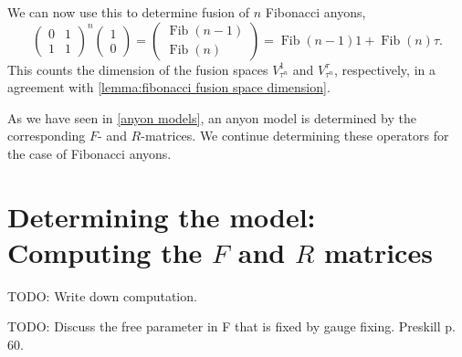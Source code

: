 \documentclass[a4paper,10pt,oneside]{book}
\theoremstyle{plain}
\theoremstyle{definition}
\theoremstyle{remark}
\DeclareMathOperator{\Fib}{Fib}
\begin{document}
We can now use this to determine fusion of $n$ Fibonacci anyons,
\begin{equation}
  \begin{pmatrix}
    0 & 1 \\
    1 & 1
  \end{pmatrix}^n
  \begin{pmatrix}
    1 \\ 0
  \end{pmatrix} =
  \begin{pmatrix}
    \Fib(n-1) \\ \Fib(n)
  \end{pmatrix}
  = \Fib(n-1) 1 + \Fib(n) \tau.
\end{equation}
This counts the dimension of the fusion spaces $V_{\tau^n}^1$ and $V_{\tau^n}^\tau$, respectively, in a agreement with \cref{lemma:fibonacci fusion space dimension}.


As we have seen in \cref{anyon models}, an anyon model is determined by the corresponding $F$- and $R$-matrices. We continue determining these operators for the case of Fibonacci anyons.






\section{Determining the model: Computing the \texorpdfstring{$F$}{F} and \texorpdfstring{$R$}{R} matrices}

TODO: Write down computation.

TODO: Discuss the free parameter in F that is fixed by gauge fixing. Preskill p. 60.

\end{document}
